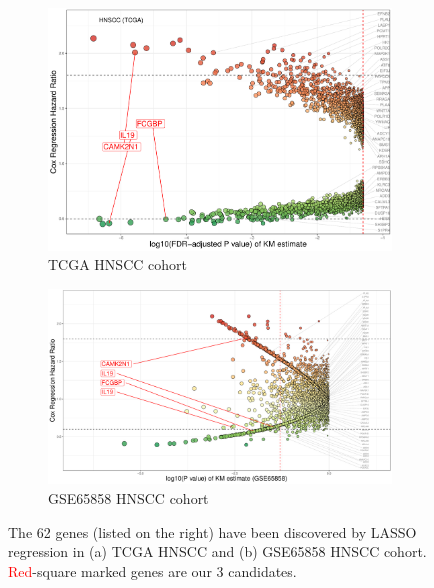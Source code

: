 \documentclass[preprint,12pt]{elsarticle}
\newenvironment{MyColorPar}[1]{%
    \leavevmode\color{#1}\ignorespaces%
}{%
}%
\begin{document}
\begin{MyColorPar}{blue}
\begin{figure}[!tbp]
  \begin{subfigure}[b]{0.5\textwidth}
        \includegraphics[width=\textwidth]{Rplot_TCGA_HNSCC_CoxHR_CAMK2N1_Bayes62_FDRKM.pdf}
        \caption{TCGA HNSCC cohort}
  \end{subfigure}
  \hfill
  \begin{subfigure}[b]{0.5\textwidth}
       \includegraphics[width=\textwidth]{Rplot_GSE65858_HNSCC_CoxHR_CAMK2N1_Bayes62_FDRKM.pdf} 
       \caption{GSE65858 HNSCC cohort}
  \end{subfigure}
  \caption{The 62 genes (listed on the right) have been discovered by LASSO regression in (a) TCGA HNSCC and (b) GSE65858 HNSCC cohort. \textcolor{red}{Red}-square marked genes are our 3 candidates.}
  \label{fig:Bayes62}
\end{figure}



\end{MyColorPar}
\end{document}
